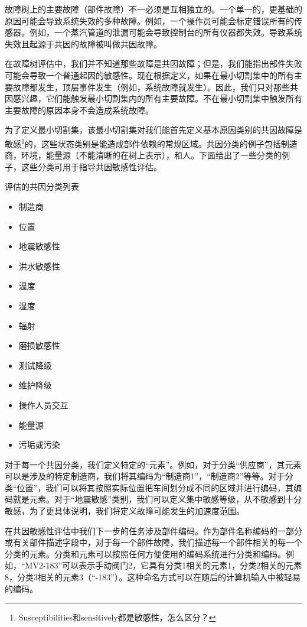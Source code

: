 \documentclass[cn,11pt,chinese]{elegantbook}
\begin{document}
{故障树上的主要故障（部件故障）不一必须是互相独立的。一个单一的，更基础的原因可能会导致系统失效的多种故障。例如，一个操作员可能会标定错误所有的传感器。例如，一个蒸汽管道的泄漏可能会导致控制台的所有仪器都失效。导致系统失效且起源于共因的故障被叫做共因故障。

在故障树评估中，我们并不知道那些故障是共因故障；但是，我们能指出部件失败可能会导致一个普通起因的敏感性。现在根据定义，如果在最小切割集中的所有主要故障都发生，顶层事件发生（例如，系统故障就发生）。因此，我们只对那些共因感兴趣，它们能触发最小切割集内的所有主要故障。不在最小切割集中触发所有主要故障的原因本身不会造成系统故障。

为了定义最小切割集，该最小切割集对我们能首先定义基本原因类别的共因故障是敏感\footnote{Susceptibilities和sensitively都是敏感性，怎么区分？}的，这些状态类别是能造成部件依赖的常规区域。共因分类的例子包括制造商，环境，能量源（不能清晰的在树上表示），和人。下面给出了一些分类的例子，这些分类可用于指导共因敏感性评估。

评估的共因分类列表

\begin{itemize}
\item 制造商
\item 位置
\item 地震敏感性
\item 洪水敏感性
\item 温度
\item 湿度
\item 辐射
\item 磨损敏感性
\item 测试降级
\item 维护降级
\item 操作人员交互
\item 能量源
\item 污垢或污染
\end{itemize}

对于每一个共因分类，我们定义特定的“元素”。例如，对于分类“供应商”，其元素可以是涉及的特定制造商，我们将其编码为“制造商1”，“制造商2”等等。对于分类“位置”，我们可以将其按照实际位置把车间划分成不同的区域并进行编码，其编码就是元素。对于“地震敏感”类别，我们可以定义集中敏感等级，从不敏感到十分敏感，为了更具体说明，我们将定义故障可能发生的加速度范围。

在共因敏感性评估中我们下一步的任务涉及部件编码。作为部件名称编码的一部分或有关部件描述字段中，对于每一个部件故障，我们描述每一个部件相关的每一个分类的元素。分类和元素可以按照任何方便使用的编码系统进行分类和编码。例如，“MV2-183”可以表示手动阀门2，它具有分类1相关的元素1，分类2相关的元素8，分类3相关的元素3（“-183”）。这种命名方式可以在随后的计算机输入中被轻易的编码。

}
\end{document}
